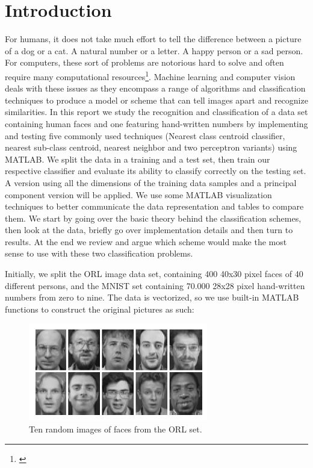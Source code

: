 \documentclass[journal]{IEEEtran}
\begin{document}
\section{Introduction}
For humans, it does not take much effort to tell the difference between a picture of a dog or a cat. A natural number or a letter. A happy person or a sad person. For computers, these sort of problems are notorious hard to solve and often require many computational resources\footnote{\cite{TerenceMills2018}}. Machine learning and computer vision deals with these issues as they encompass a range of algorithms and classification techniques to produce a model or scheme that can tell images apart and recognize similarities. In this report we study the recognition and classification of a data set containing human faces and one featuring hand-written numbers by implementing and testing five commonly used techniques (Nearest class centroid classifier, nearest sub-class centroid, nearest neighbor and two perceptron variants) using MATLAB. We split the data in a training and a test set, then train our respective classifier and evaluate its ability to classify correctly on the testing set. A version using all the dimensions of the training data samples and a principal component version will be applied. We use some MATLAB visualization techniques to better communicate the data representation and tables to compare them. We start by going over the basic theory behind the classification schemes, then look at the data, briefly go over implementation details and then turn to results. At the end we review and argue which scheme would make the most sense to use with these two classification problems.

Initially, we split the ORL image data set, containing 400 40x30 pixel faces of 40 different persons, and the MNIST set containing 70.000 28x28 pixel hand-written numbers from zero to nine. The data is vectorized, so we use built-in MATLAB functions to construct the original pictures as such:

\begin{figure}[h]
	\centering
	\includegraphics[width=0.7\linewidth]{orlfaces}
	\caption{Ten random images of faces from the ORL set.}
	\label{fig:orlfaces}
\end{figure}
\end{document}
